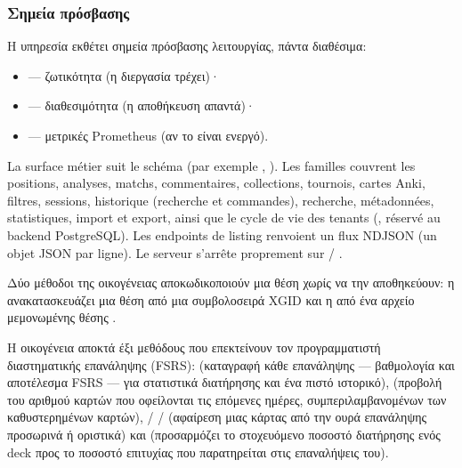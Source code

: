 \documentclass[letterpaper,10pt,greek]{sphinxmanual}
\begin{document}
\subsubsection{Σημεία πρόσβασης}
\label{\detokenize{mode_headless:points-d-acces}}
\sphinxAtStartPar
Η υπηρεσία εκθέτει σημεία πρόσβασης λειτουργίας, πάντα διαθέσιμα:
\begin{itemize}
\item {} 
\sphinxAtStartPar
{} — ζωτικότητα (η διεργασία τρέχει)·

\item {} 
\sphinxAtStartPar
{} — διαθεσιμότητα (η αποθήκευση απαντά)·

\item {} 
\sphinxAtStartPar
{} — μετρικές Prometheus (αν το  είναι ενεργό).

\end{itemize}

\sphinxAtStartPar
La surface métier suit le schéma  (par exemple
, ). Les familles couvrent les
positions, analyses, matchs, commentaires, collections, tournois, cartes Anki,
filtres, sessions, historique (recherche et commandes), recherche,
métadonnées, statistiques, import et export, ainsi que le cycle de vie des
tenants (, réservé au backend PostgreSQL). Les endpoints de
listing renvoient un flux NDJSON (un objet JSON par ligne). Le serveur
s’arrête proprement sur  / .

\sphinxAtStartPar
Δύο μέθοδοι της οικογένειας  αποκωδικοποιούν μια θέση χωρίς να την αποθηκεύουν: η  ανακατασκευάζει μια θέση από μια συμβολοσειρά XGID και η  από ένα αρχείο μεμονωμένης θέσης .

\sphinxAtStartPar
Η οικογένεια  αποκτά έξι μεθόδους που επεκτείνουν τον προγραμματιστή διαστηματικής επανάληψης (FSRS):  (καταγραφή κάθε επανάληψης — βαθμολογία και αποτέλεσμα FSRS — για στατιστικά διατήρησης και ένα πιστό ιστορικό),  (προβολή του αριθμού καρτών που οφείλονται τις επόμενες ημέρες, συμπεριλαμβανομένων των καθυστερημένων καρτών),  /  /  (αφαίρεση μιας κάρτας από την ουρά επανάληψης προσωρινά ή οριστικά) και  (προσαρμόζει το στοχευόμενο ποσοστό διατήρησης ενός deck προς το ποσοστό επιτυχίας που παρατηρείται στις επαναλήψεις του).
\end{document}
